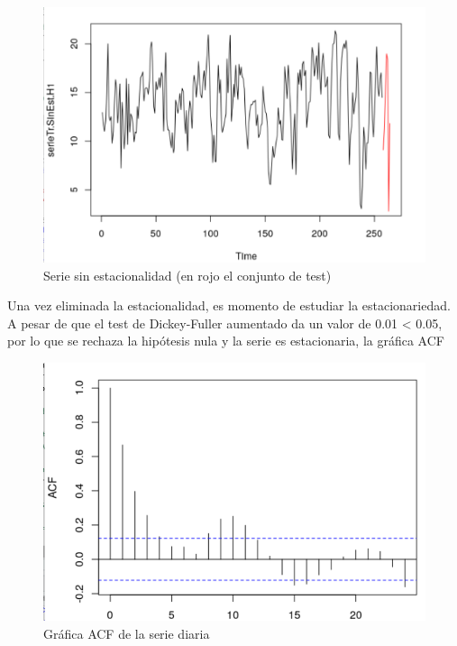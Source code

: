 \begin{figure}[H] %
	\centering
	\includegraphics[scale=0.25]{diaria-Sin-Est.png}  %
	\caption{Serie sin estacionalidad (en rojo el conjunto de test)} 
	\label{fig:diaria-sinest2}
\end{figure}

Una vez eliminada la estacionalidad, es momento de estudiar la estacionariedad. A pesar de que el test de Dickey-Fuller aumentado da un valor de 0.01 < 0.05, por lo que se rechaza la hipótesis nula y la serie es estacionaria, la gráfica ACF 

\begin{figure}[H] %
	\centering
	\includegraphics[scale=0.25]{acf-diario.png}  %
	\caption{Gráfica ACF de la serie diaria} 
	\label{fig:acf-diario}
\end{figure}

